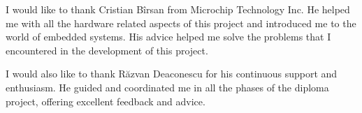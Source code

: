 \vspace*{7cm}
\begin{center}
I would like to thank Cristian Bîrsan from Microchip Technology Inc. He helped me with all the hardware related aspects of this project and introduced me to the world of embedded systems. His advice helped me solve the problems that I encountered in the development of this project. 
\end{center}
\vspace{0.6cm}
\begin{center}
I would also like to thank Răzvan Deaconescu for his continuous support and enthusiasm. He guided and coordinated me in all the phases of the diploma project, offering excellent feedback and advice.
\end{center}
